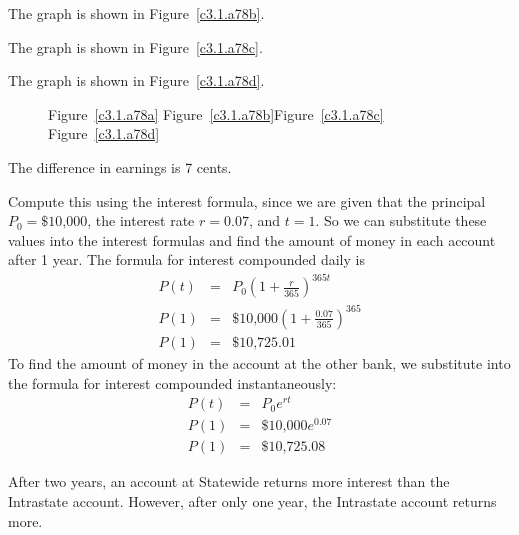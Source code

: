   The graph is shown in Figure~\ref{c3.1.a78b}.

  The graph is shown in Figure~\ref{c3.1.a78c}.

  The graph is shown in Figure~\ref{c3.1.a78d}.

\begin{figure}[htb]
                       \centerline{%
                       }
	\centerline{Figure~\ref{c3.1.a78a}\hspace{0.8in}
	Figure~\ref{c3.1.a78b}\hspace{0.8in}Figure~\ref{c3.1.a78c}
	\hspace{0.8in}Figure~\ref{c3.1.a78d}}
\end{figure}

\ans The difference in earnings is 7 cents.

\soln Compute this using the interest
formula, since we are given that the principal $P_0 = \$10\mbox{,}000$,
the interest rate $r = 0.07$, and $t = 1$.  So we can substitute
these values into the interest formulas and find the amount of money
in each account after 1 year.  The formula for interest compounded daily is
\[ \begin{array}{rcl}
P(t) & = & P_0\left(1 + \frac{r}{365}\right)^{365t} \\
P(1) & = & \$10\mbox{,}000\left(1 + \frac{0.07}{365}\right)^{365} \\
P(1) & = & \$10\mbox{,}725.01\end{array}
\]
To find the amount of money in the account at the other bank, we substitute
into the formula for interest compounded instantaneously:
\[ \begin{array}{rcl}
P(t) & = & P_0e^{rt} \\
P(1) & = & \$10\mbox{,}000e^{0.07} \\
P(1) & = & \$10\mbox{,}725.08\end{array}
\]

\ans After two years, an account at Statewide returns more interest than
the Intrastate account.  However, after only one year, the Intrastate
account returns more.

